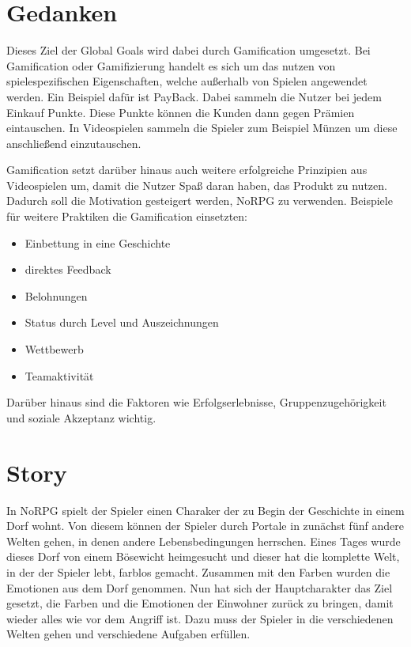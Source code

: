 	
\section{Gedanken} %

Dieses Ziel der Global Goals wird dabei durch Gamification umgesetzt. Bei Gamification oder Gamifizierung handelt es sich um das nutzen von spielespezifischen Eigenschaften, welche außerhalb von Spielen angewendet werden. Ein Beispiel dafür ist PayBack. Dabei sammeln die Nutzer bei jedem Einkauf Punkte. Diese Punkte können die Kunden dann gegen Prämien eintauschen. In Videospielen sammeln die Spieler zum Beispiel Münzen um diese anschließend einzutauschen. 

Gamification setzt darüber hinaus auch weitere erfolgreiche Prinzipien aus Videospielen um, damit die Nutzer Spaß daran haben, das Produkt zu nutzen. Dadurch soll die Motivation gesteigert werden, NoRPG zu verwenden. Beispiele für weitere Praktiken die Gamification einsetzten:
\begin{itemize}
\item Einbettung in eine Geschichte
\item direktes Feedback
\item Belohnungen
\item Status durch Level und Auszeichnungen
\item Wettbewerb
\item Teamaktivität
\end{itemize}

Darüber hinaus sind die Faktoren wie Erfolgserlebnisse, Gruppenzugehörigkeit und soziale Akzeptanz wichtig.

	
\section{Story}

In NoRPG spielt der Spieler einen Charaker der zu Begin der Geschichte in einem Dorf wohnt. Von diesem können der Spieler durch Portale in zunächst fünf andere Welten gehen, in denen andere Lebensbedingungen herrschen. Eines Tages wurde dieses Dorf von einem Bösewicht heimgesucht und dieser hat die komplette Welt, in der der Spieler lebt, farblos gemacht. Zusammen mit den Farben wurden die Emotionen aus dem Dorf genommen. Nun hat sich der Hauptcharakter das Ziel gesetzt, die Farben und die Emotionen der Einwohner zurück zu bringen, damit wieder alles wie vor dem Angriff ist. Dazu muss der Spieler in die verschiedenen Welten gehen und verschiedene Aufgaben erfüllen.

